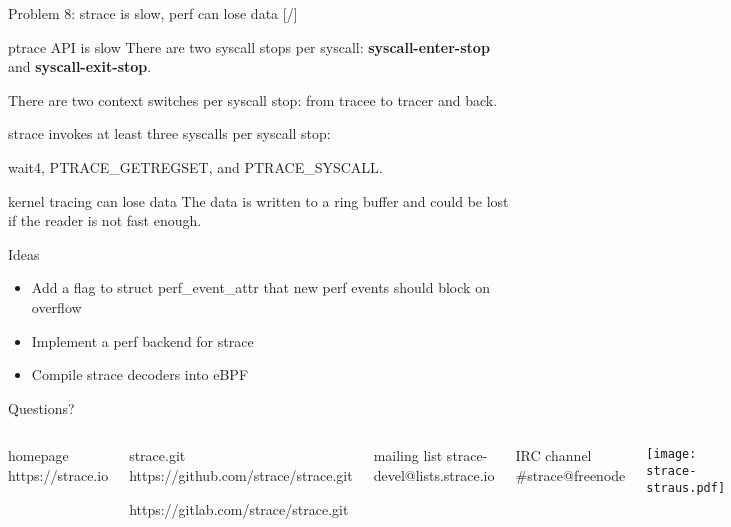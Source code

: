 \documentclass[unicode,aspectratio=169]{beamer}
\begin{document}
\begin{frame}{Problem 8: strace is slow, perf can lose data \hfill [\insertframenumber/\inserttotalframenumber]}

\begin{block}{ptrace API is slow}
There are two syscall stops per syscall: \textbf{syscall-enter-stop} and \textbf{syscall-exit-stop}.

There are two context switches per syscall stop: from tracee to tracer and back.

strace invokes at least three syscalls per syscall stop:

wait4, PTRACE\_GETREGSET, and PTRACE\_SYSCALL.
\end{block}

\begin{block}{kernel tracing can lose data}
The data is written to a ring buffer and could be lost if the reader is not fast enough.
\end{block}

\begin{block}{Ideas}
\begin{itemize}
\item Add a flag to struct perf\_event\_attr that new perf events should block on overflow
\item Implement a perf backend for strace
\item Compile strace decoders into eBPF
\end{itemize}
\end{block}
\end{frame}

{
\begin{frame}{Questions?}
	\begin{columns}
		\column{7cm}
\begin{block}{\large homepage}
	https://strace.io
\end{block}
\begin{block}{\large strace.git}
	https://github.com/strace/strace.git

	https://gitlab.com/strace/strace.git
\end{block}
\begin{block}{\large mailing list}
	strace-devel@lists.strace.io
\end{block}
\begin{block}{\large IRC channel}
	\#strace@freenode
\end{block}
		\column{3cm}
			\centerline{\texttt{[image: strace-straus.pdf]}}
	\end{columns}
\end{frame}
}
\end{document}
